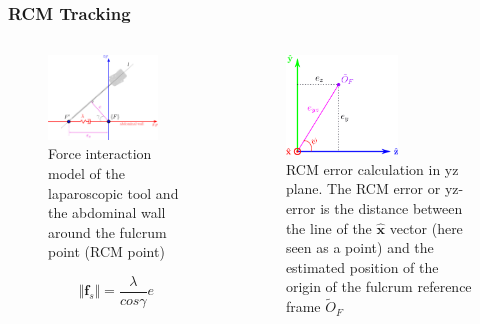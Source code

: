 \begin{frame}
\frametitle{RCM Tracking}
\begin{columns}
\begin{center}
\begin{figure}[!htb]
\centering
\includegraphics[width=0.8\textwidth]{../images/rcm-force-interaction-model.png}
\caption{Force interaction model of the laparoscopic tool and the abdominal wall around the fulcrum point (RCM point)}
\label{rcm-force-interaction-model}
\end{figure}
\[
\Vert \mathbf{f}_s \Vert = \frac{λ}{cosγ} e 
\]
\end{center}


\begin{center}
\begin{figure}[!htb]
\centering
\includegraphics[width=0.6\textwidth]{../images/rcm-error-yz.png}
\caption{RCM error calculation in yz plane. The RCM error or yz-error is the distance between the line of the $\mathbf{\hat{x}}$ vector (here seen as a point) and the estimated position of the origin of the
fulcrum reference frame $\tilde{O}_F$}
\label{rcm-error-yz-plane}
\end{figure}
\end{center}

\end{columns}
\end{frame}

